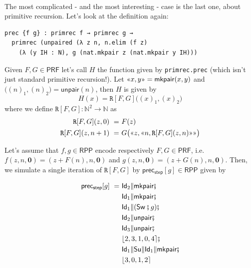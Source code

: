 \documentclass{book}
\theoremstyle{definition}
\theoremstyle{remark}
\theoremstyle{plain}
\newcommand{\NN}{\mathbb{N}}
\newcommand{\gl}{\text{\guillemotleft}}
\newcommand{\gr}{\text{\guillemotright}}
\newcommand{\RPP}{\mathsf{RPP}}
\newcommand{\rppId}{\mathsf{Id}}
\newcommand{\rppSu}{\mathsf{Su}}
\newcommand{\rppSw}{\mathsf{Sw}}
\newcommand{\rppCo}{\fatsemi}
\newcommand{\rppPa}{\Vert}
\newcommand{\rpprewire}[1]{\lfloor #1 \rceil}
\newcommand{\rppmkpair}{\mathsf{mkpair}}
\newcommand{\rppunpair}{\mathsf{unpair}}
\newcommand{\rppprecstep}{\mathsf{prec_{step}}}
\newcommand{\PRF}{\mathsf{PRF}}
\newcommand{\prPrec}{\mathtt{R}}
\begin{document}
\paragraph{}

The most complicated - and the most interesting - case is the last one,
about primitive recursion.
Let's look at the definition again:
\begin{lstlisting}
prec {f g} : primrec f → primrec g →
  primrec (unpaired (λ z n, n.elim (f z)
    (λ (y IH : N), g (nat.mkpair z (nat.mkpair y IH)))
\end{lstlisting}
Given $F, G \in \PRF$ let's call $H$ the function given by \lstinline{primrec.prec}
(which isn't just standard primitive recursion!).
Let $\gl x, y \gr = \rppmkpair(x,y)$ and $\big( (n)_1, (n)_2 \big) = \rppunpair(n)$,
then $H$ is given by
\[ H(x) = \prPrec[F,G]\big( (x)_1, (x)_2 \big) \]
where we define $\prPrec[F,G] : \NN^2 \to \NN$ as
\begin{align*}
  \prPrec[F,G](z,0) \ = \ & F(z) \\
  \prPrec[F,G](z, n+1) \ = \ & G \big( \gl z, \gl n, \prPrec[F,G](z,n) \gr \gr \big)
\end{align*}

Let's assume that $f, g \in \RPP$ encode respectively $F, G \in \PRF$, i.e.
$f(z, n, \boldsymbol{0}) = (z+F(n), n, \boldsymbol{0})$ and $g(z, n, \boldsymbol{0}) = (z+G(n), n, \boldsymbol{0})$.
Then, we simulate a single iteration of $\prPrec[F,G]$ by $\rppprecstep[g] \in \RPP$ given by

\begin{align*}
\rppprecstep[g] \ = \ & \rppId_2 \rppPa \rppmkpair \rppCo                               \\
                      & \rppId_1 \rppPa \rppmkpair \rppCo                               \\
                      & \rppId_1 \rppPa (\rppSw \rppCo g) \rppCo                        \\
                      & \rppId_2 \rppPa \rppunpair \rppCo                               \\
                      & \rppId_3 \rppPa \rppunpair \rppCo                               \\
                      & \rpprewire{2, 3, 1, 0, 4} \rppCo                                \\
                      & \rppId_1 \rppPa \rppSu \rppPa \rppId_1 \rppPa \rppmkpair \rppCo \\
                      & \rpprewire{3, 0, 1, 2}                                          \\
\end{align*}
\end{document}
